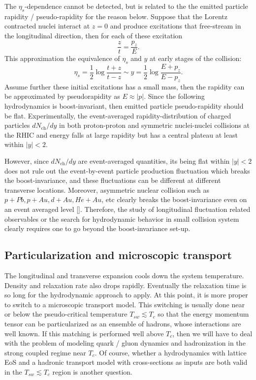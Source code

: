 The $\eta_s$-dependence cannot be detected, but is related to the the emitted particle rapidity / pseudo-rapidity for the reason below.
Suppose that the Lorentz contracted nuclei interact at $z=0$ and produce excitations that free-stream in the longitudinal direction, then for each of these excitation
\begin{equation}
  \frac{z}{t} = \frac{p_z}{E}.
\end{equation}
This approximation the equivalence of $\eta_s$ and $y$ at early stages of the collision:
\begin{equation}
  \eta_s = \frac{1}{2}\log\frac{t+z}{t-z} \sim y = \frac{1}{2}\log\frac{E+p_z}{E-p_z}.
\end{equation}
Assume further these initial excitations has a small mass, then the rapidity can be approximated by pseudorapidity as $E\approx |p|$.
Since the following hydrodynamics is boost-invariant, then emitted particle pseudo-rapidity should be flat.
Experimentally, the event-averaged rapidity-distribution of charged particles $dN_{\textrm{ch}}/dy$ in both proton-proton and symmetric nuclei-nuclei collisions at the RHIC and energy falls at large rapidity but has a central plateau at least within $|y|<2$.

However, since $dN_{\textrm{ch}}/dy$ are event-averaged quantities, its being flat within $|y|<2$ does not rule out the event-by-event particle production fluctuation which breaks the boost-invariance, and these fluctuations can be different at different transverse locations.
Moreover, asymmetric nuclear collision such as $p+Pb, p+Au, d+Au, He+Au$, etc clearly breaks the boost-invariance even on an event averaged level []. 
Therefore, the study of longitudinal fluctuation related observables or the search for hydrodynamic behavior in small collision system clearly requires one to go beyond the boost-invariance set-up.

\subsection{Particularization and microscopic transport}
The longitudinal and transverse expansion cools down the system temperature. 
Density and relaxation rate also drops rapidly.
Eventually the relaxation time is so long for the hydrodynamic approach to apply.
At this point, it is more proper to switch to a microscopic transport model.
This switching is usually done near or below the pseudo-critical temperature $T_{sw} \lesssim T_c$ so that the energy momentum tensor can be particularized as an ensemble of hadrons, whose interactions are well known.
If this matching is performed well above $T_c$, then we will have to deal with the problem of modeling quark / gluon dynamics and hadronization in the strong coupled regime near $T_c$.
Of course, whether a hydrodynamics with lattice EoS and a hadronic transport model with cross-sections as inputs are both valid in the $T_{sw} \lesssim T_c$ region is another question.

